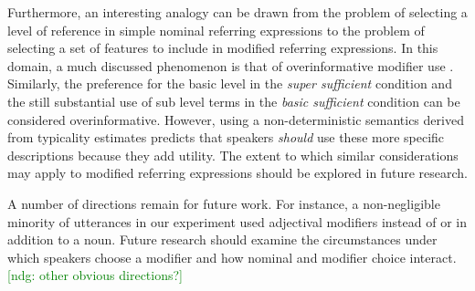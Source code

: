 \documentclass[10pt,letterpaper]{article}
\newcommand{\jd}[1]{\textcolor{Blue}{[jd: #1]}}
\newcommand{\ndg}[1]{\textcolor{Green}{[ndg: #1]}}
\begin{document}


Furthermore, an interesting analogy can be drawn from the problem of selecting a level of reference in simple nominal referring expressions to the problem of selecting a set of features to include in modified referring expressions. In this domain, a much discussed phenomenon is that of overinformative modifier use \cite{Gatt2014}. Similarly, the preference for the basic level in the \emph{super sufficient} condition and the still substantial use of sub level terms in the \emph{basic sufficient} condition can be considered overinformative. However, using a non-deterministic semantics derived from typicality estimates predicts that speakers \emph{should} use these more specific descriptions because they add utility. The extent to which similar considerations may apply to modified referring expressions should be explored in future research.


A number of directions remain for future work.
For instance, a non-negligible minority of utterances in our experiment used adjectival modifiers instead of or in addition to a noun. 
Future research should examine the circumstances under which speakers choose a modifier and how nominal and modifier choice interact.
\ndg{other obvious directions?}
%
\end{document}
